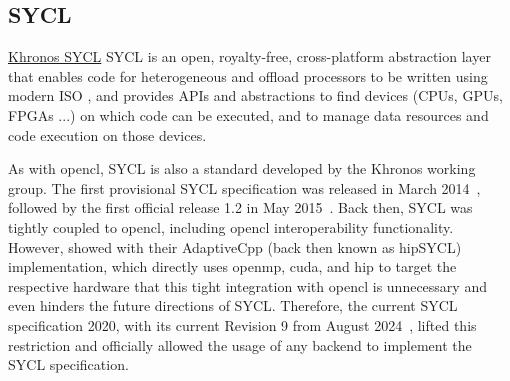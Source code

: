 \subsection{SYCL}
\label{sec:frameworks:sycl}

\begin{quotebox}{\href{https://www.khronos.org/sycl/}{Khronos SYCL}}
    SYCL is an open, royalty-free, cross-platform abstraction layer that enables code for heterogeneous and offload processors to be written using modern ISO \cpp, and provides APIs and abstractions to find devices (CPUs, GPUs, FPGAs ...) on which code can be executed, and to manage data resources and code execution on those devices.
\end{quotebox}

As with \gls{opencl}, SYCL is also a standard developed by the Khronos working group. 
The first provisional SYCL specification was released in March 2014~\cite{khronos_sycl_working_group_khronos_2014}, followed by the first official release 1.2 in May 2015~\cite{khronos_sycl_working_group_khronos_2015}. 
Back then, SYCL was tightly coupled to \gls{opencl}, including \gls{opencl} interoperability functionality. 
However, \citet{alpay_sycl_2020} showed with their AdaptiveCpp (back then known as hipSYCL) implementation, which directly uses \gls{openmp}, \gls{cuda}, and \gls{hip} to target the respective hardware that this tight integration with \gls{opencl} is unnecessary and even hinders the future directions of SYCL. 
Therefore, the current SYCL specification 2020, with its current Revision 9 from August 2024~\cite{khronos_sycl_working_group_sycl_2024}, lifted this restriction and officially allowed the usage of any backend to implement the SYCL specification. 

